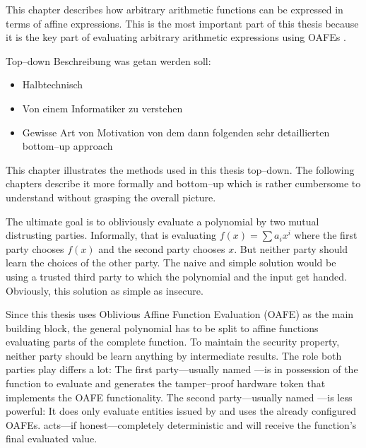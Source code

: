 \label{sec:methods}

This chapter describes how arbitrary arithmetic functions can be expressed in
terms of affine expressions. This is the most important part of this thesis
because it is the key part of evaluating arbitrary arithmetic expressions
using OAFEs \cite{davidgoliath}.

\begin{JWtodoBox}

  Top--down Beschreibung was getan werden soll:

  \begin{itemize}

    \item Halbtechnisch

    \item Von einem Informatiker zu verstehen

    \item Gewisse Art von Motivation von dem dann folgenden sehr detaillierten
      bottom--up approach

  \end{itemize}

\end{JWtodoBox}


This chapter illustrates the methods used in this thesis top--down. The
following chapters describe it more formally and bottom--up which is rather
cumbersome to understand without grasping the overall picture.

The ultimate goal is to obliviously evaluate a polynomial by two mutual
distrusting parties. Informally, that is evaluating $f(x) = \sum a_ix^i$ where
the first party chooses $f(x)$ and the second party chooses $x$. But neither
party should learn the choices of the other party. The naive and simple solution
would be using a trusted third party to which the polynomial and the input get
handed. Obviously, this solution as simple as insecure.

Since this thesis uses Oblivious Affine Function Evaluation (OAFE) as the main
building block, the general polynomial has to be split to affine functions
evaluating parts of the complete function. To maintain the security property,
neither party should be learn anything by intermediate results. The role both
parties play differs a lot: The first party---usually named \JWpOne{}---is in
possession of the function to evaluate and generates the tamper--proof hardware
token that implements the OAFE functionality. The second party---usually named
\JWpTwo{}---is less powerful: It does only evaluate entities issued by \JWpOne{}
and uses the already configured OAFEs. \JWpTwo{} acts---if honest---completely
deterministic and will receive the function's final evaluated value.

